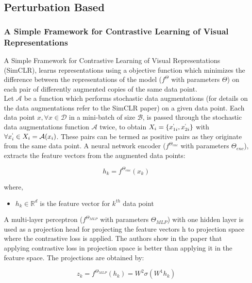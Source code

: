 \subsection{Perturbation Based}
\subsubsection{A Simple Framework for Contrastive Learning of Visual Representations
\cite{chen2020}}
A Simple Framework for Contrastive Learning of Visual Representations (SimCLR), learns representations using a objective function which minimizes the difference between the representations of the model ($f^\Theta$ with parameters $\Theta$) on each pair of differently augmented copies of the same data point. \\
Let $\mathcal{A}$ be a function which performs stochastic data augmentations (for details on the data augmentations refer to the SimCLR paper) on a given data point. Each data point $x, \forall x \in \mathcal{D}$ in a mini-batch of size $\mathcal{B}$, is passed through the stochastic data augmentations function $\mathcal{A}$ twice, to obtain $X_i = \{x_{1i}^{`}, x_{2i}^{`}\}$ with $\forall x_i^{`} \in X_i = \mathcal{A}(x_i)$. These pairs can be termed as positive pairs as they originate from the same data point. A neural network encoder ($f^{\Theta_{enc}}$ with parameters $\Theta_{enc}$), extracts the feature vectors from the augmented data points:

\begin{equation}
    \label{equation:simclr_encoder}
    h_k = f^{\Theta_{enc}}(x_k)
\end{equation}

where,
\begin{itemize}[label={}]
  \setlength\itemsep{0em}
  \item $h_k \in \mathbb{R}^{d}$ is the feature vector for $k^{th}$ data point
\end{itemize}

A multi-layer perceptron ($f^{\Theta_{MLP}}$ with parameters $\Theta_{MLP}$) with one hidden layer is used as a projection head for projecting the feature vectors h to projection space where the contrastive loss is applied. The authors show in the paper that applying contrastive loss in projection space is better than applying it in the feature space. The projections are obtained by:

\begin{equation}
    \label{equation:simclr_mlp}
    z_k = f^{\Theta_{MLP}}(h_k) = W^{2}\sigma(W^{1}h_k)
\end{equation}

